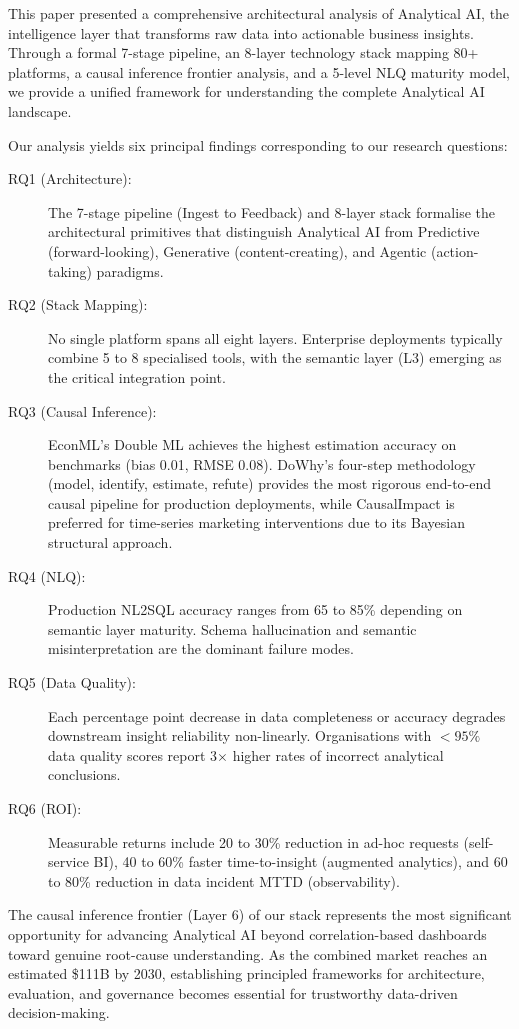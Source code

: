 \documentclass[12pt, a4paper]{article}
\begin{document}
This paper presented a comprehensive architectural analysis of Analytical AI, the intelligence layer that transforms raw data into actionable business insights. Through a formal 7-stage pipeline, an 8-layer technology stack mapping 80+ platforms, a causal inference frontier analysis, and a 5-level NLQ maturity model, we provide a unified framework for understanding the complete Analytical AI landscape.

Our analysis yields six principal findings corresponding to our research questions:

\begin{description}
    \item[RQ1 (Architecture):] The 7-stage pipeline (Ingest to Feedback) and 8-layer stack formalise the architectural primitives that distinguish Analytical AI from Predictive (forward-looking), Generative (content-creating), and Agentic (action-taking) paradigms.
    \item[RQ2 (Stack Mapping):] No single platform spans all eight layers. Enterprise deployments typically combine 5 to 8 specialised tools, with the semantic layer (L3) emerging as the critical integration point.
    \item[RQ3 (Causal Inference):] EconML's Double ML achieves the highest estimation accuracy on benchmarks (bias 0.01, RMSE 0.08). DoWhy's four-step methodology (model, identify, estimate, refute) provides the most rigorous end-to-end causal pipeline for production deployments, while CausalImpact is preferred for time-series marketing interventions due to its Bayesian structural approach.
    \item[RQ4 (NLQ):] Production NL2SQL accuracy ranges from 65 to 85\% depending on semantic layer maturity. Schema hallucination and semantic misinterpretation are the dominant failure modes.
    \item[RQ5 (Data Quality):] Each percentage point decrease in data completeness or accuracy degrades downstream insight reliability non-linearly. Organisations with $<95\%$ data quality scores report 3$\times$ higher rates of incorrect analytical conclusions.
    \item[RQ6 (ROI):] Measurable returns include 20 to 30\% reduction in ad-hoc requests (self-service BI), 40 to 60\% faster time-to-insight (augmented analytics), and 60 to 80\% reduction in data incident MTTD (observability).
\end{description}

The causal inference frontier (Layer 6) of our stack represents the most significant opportunity for advancing Analytical AI beyond correlation-based dashboards toward genuine root-cause understanding. As the combined market reaches an estimated \$111B by 2030, establishing principled frameworks for architecture, evaluation, and governance becomes essential for trustworthy data-driven decision-making.
\end{document}
